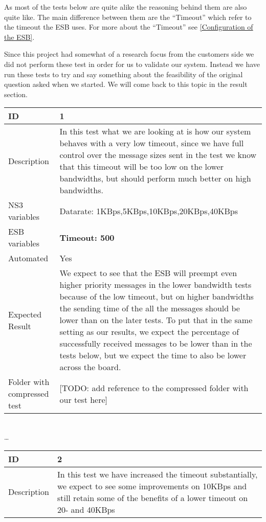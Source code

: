 	As most of the tests below are quite alike the reasoning behind them are also quite like. The main difference between them are the “Timeout” which refer to the timeout the ESB uses. For more about the “Timeout” see \ref{Configuration of the ESB}.

	Since this project had somewhat of a research focus from the customers side we did not perform these test in order for us to validate our system. Instead we have run these tests to try and say something about the feasibility of the original question asked when we started. We will come back to this topic in the result section.
\begin{center}
\begin{tabular}{| p{4cm} | p{8cm} |}%
\hline
ID & 1 \\
\hline
Description &  In this test what we are looking at is how our system behaves with a very low timeout, since we have full control over the message sizes sent in the test we know that this timeout will be too low on the lower bandwidths, but should perform much better on high bandwidths. \\
\hline
NS3 variables & Datarate: 1KBps,5KBps,10KBps,20KBps,40KBps \\
\hline
ESB variables & \textbf{Timeout: 500} \\
\hline
Automated & Yes \\
\hline
Expected Result & We expect to see that the ESB will preempt even higher priority messages in the lower bandwidth tests because of the low timeout, but on higher bandwidths the sending time of the all the messages should be lower than on the later tests. To put that in the same setting as our results, we expect the percentage of successfully received messages to be lower than in the tests below, but we expect the time to also be lower across the board.  \\
\hline
Folder with compressed test & [TODO: add reference to the compressed folder with our test here]\\
\hline
\end{tabular}
\\ \ldots \\
\begin{tabular}{| p{4cm} | p{8cm} |}%
\hline
ID & 2 \\
\hline
Description & In this test we have increased the timeout substantially, we expect to see some improvements on 10KBps and still retain some of the benefits of a lower timeout on 20- and 40KBps \\

\end{tabular}
\end{center}

